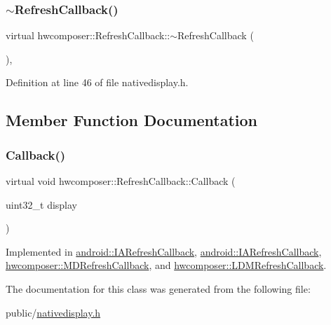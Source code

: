 \subsubsection{\texorpdfstring{$\sim$\+Refresh\+Callback()}{~RefreshCallback()}}
{\footnotesize\ttfamily virtual hwcomposer\+::\+Refresh\+Callback\+::$\sim$\+Refresh\+Callback (\begin{DoxyParamCaption}{ }\end{DoxyParamCaption})\hspace{0.3cm}{\ttfamily [inline]}, {\ttfamily [virtual]}}



Definition at line 46 of file nativedisplay.\+h.


\begin{DoxyCode}{0}
\end{DoxyCode}


\subsection{Member Function Documentation}
\mbox{\label{classhwcomposer_1_1RefreshCallback_a5637a4b1437bbf8c93d8356addbf7c87}} 
\subsubsection{\texorpdfstring{Callback()}{Callback()}}
{\footnotesize\ttfamily virtual void hwcomposer\+::\+Refresh\+Callback\+::\+Callback (\begin{DoxyParamCaption}\item[{uint32\+\_\+t}]{display }\end{DoxyParamCaption})\hspace{0.3cm}{\ttfamily [pure virtual]}}



Implemented in \mbox{\hyperlink{classandroid_1_1IARefreshCallback_ab43c3e9561417b640ff0091265097c4c}{android\+::\+I\+A\+Refresh\+Callback}}, \mbox{\hyperlink{classandroid_1_1IARefreshCallback_a7828a460befba5fc2cf3e9e5274b4e6f}{android\+::\+I\+A\+Refresh\+Callback}}, \mbox{\hyperlink{classhwcomposer_1_1MDRefreshCallback_a398cbe9e48e0b40eb73588d772da6833}{hwcomposer\+::\+M\+D\+Refresh\+Callback}}, and \mbox{\hyperlink{classhwcomposer_1_1LDMRefreshCallback_a0bc9239fba543393d72ea68f9ee5abab}{hwcomposer\+::\+L\+D\+M\+Refresh\+Callback}}.



The documentation for this class was generated from the following file\+:\begin{DoxyCompactItemize}
\item 
public/\mbox{\hyperlink{nativedisplay_8h}{nativedisplay.\+h}}\end{DoxyCompactItemize}
